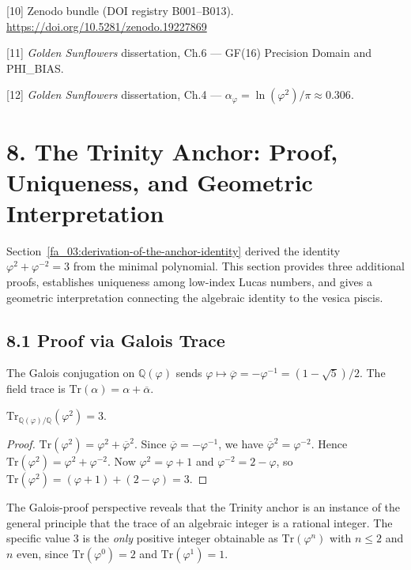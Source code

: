 [10] Zenodo bundle (DOI registry B001--B013).
\url{https://doi.org/10.5281/zenodo.19227869}

[11] \emph{Golden Sunflowers} dissertation,
Ch.6 --- GF(16) Precision Domain and PHI\_BIAS.

[12] \emph{Golden Sunflowers} dissertation,
Ch.4 ---
\(\alpha_\varphi = \ln(\varphi^2)/\pi \approx 0.306\).

\section{8. The Trinity Anchor: Proof, Uniqueness, and Geometric
Interpretation}\label{fa_03:trinity-anchor-proof}

Section~\ref{fa_03:derivation-of-the-anchor-identity} derived the
identity $\varphi^{2} + \varphi^{-2} = 3$ from the minimal
polynomial. This section provides three additional proofs, establishes
uniqueness among low-index Lucas numbers, and gives a geometric
interpretation connecting the algebraic identity to the vesica piscis.

\subsection{8.1 Proof via Galois Trace}\label{fa_03:proof-galois}

The Galois conjugation on $\mathbb{Q}(\varphi)$ sends
$\varphi \mapsto \overline{\varphi} = -\varphi^{-1} = (1-\sqrt{5})/2$.
The field trace is $\mathrm{Tr}(\alpha) = \alpha +
\overline{\alpha}$.

\begin{theorem}
\label{fa_03:thm:anchor-galois}
$\mathrm{Tr}_{\mathbb{Q}(\varphi)/\mathbb{Q}}(\varphi^{2}) = 3$.
\end{theorem}

\begin{proof}
$\mathrm{Tr}(\varphi^{2}) = \varphi^{2} + \overline{\varphi}^{2}$.
Since $\overline{\varphi} = -\varphi^{-1}$, we have
$\overline{\varphi}^{2} = \varphi^{-2}$. Hence
$\mathrm{Tr}(\varphi^{2}) = \varphi^{2} + \varphi^{-2}$.
Now $\varphi^{2} = \varphi + 1$ and $\varphi^{-2} = 2 - \varphi$,
so $\mathrm{Tr}(\varphi^{2}) = (\varphi + 1) + (2 - \varphi) = 3$.
\end{proof}

The Galois-proof perspective reveals that the Trinity anchor is an
instance of the general principle that the trace of an algebraic
integer is a rational integer. The specific value $3$ is the
\emph{only} positive integer obtainable as $\mathrm{Tr}(\varphi^{n})$
with $n \le 2$ and $n$ even, since $\mathrm{Tr}(\varphi^{0}) = 2$
and $\mathrm{Tr}(\varphi^{1}) = 1$.

